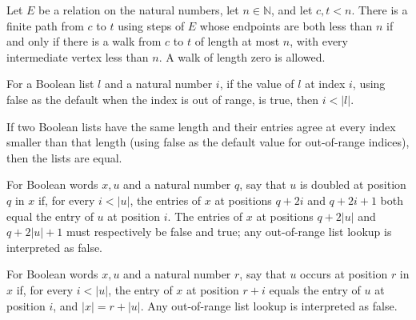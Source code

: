 \begin{lemma}
\label{Complexity.reach_iff_walkLe}
\leanok
{}
Let $E$ be a relation on the natural numbers, let $n\in\mathbb{N}$, and let $c,t<n$.
There is a finite path from $c$ to $t$ using steps of $E$ whose endpoints are both less
than $n$ if and only if there is a walk from $c$ to $t$ of length at most $n$, with
every intermediate vertex less than $n$. A walk of length zero is allowed.
\end{lemma}

\begin{lemma}
\label{Complexity.lt_of_getD_true}
\leanok
{}
For a Boolean list $l$ and a natural number $i$, if the value of $l$ at index $i$, using
false as the default when the index is out of range, is true, then $i<|l|$.
\end{lemma}

\begin{lemma}
\label{Complexity.ext_getD'}
\leanok
{}
If two Boolean lists have the same length and their entries agree at every index smaller
than that length (using false as the default value for out-of-range indices), then the
lists are equal.
\end{lemma}

\begin{definition}
\label{Complexity.DblAt}
\leanok
For Boolean words $x,u$ and a natural number $q$, say that $u$ is doubled at position
$q$ in $x$ if, for every $i<|u|$, the entries of $x$ at positions $q+2i$ and $q+2i+1$
both equal the entry of $u$ at position $i$. The entries of $x$ at positions $q+2|u|$
and $q+2|u|+1$ must respectively be false and true; any out-of-range list lookup is
interpreted as false.
\end{definition}

\begin{definition}
\label{Complexity.PlainAt}
\leanok
For Boolean words $x,u$ and a natural number $r$, say that $u$ occurs at position $r$ in
$x$ if, for every $i<|u|$, the entry of $x$ at position $r+i$ equals the entry of $u$ at
position $i$, and $|x|=r+|u|$. Any out-of-range list lookup is interpreted as false.
\end{definition}

